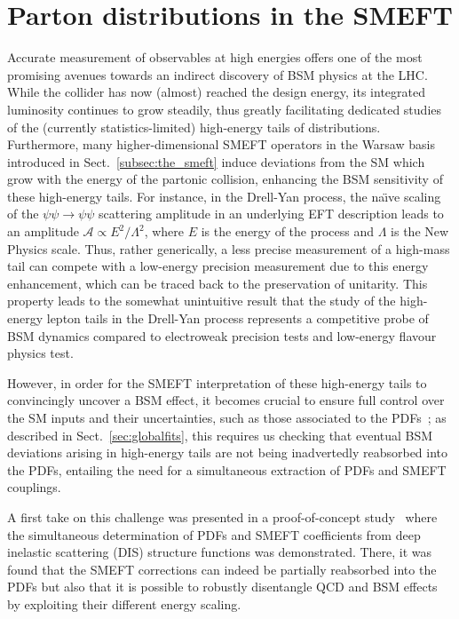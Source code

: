 \documentclass[withindex,glossary]{cam-thesis}
\begin{document}
\section{Parton distributions in the SMEFT}
\label{sec:introduction}
Accurate measurement of observables at high energies offers one of the most promising avenues towards an indirect discovery of BSM physics at the LHC. While the collider has now (almost) reached the design energy, its integrated luminosity continues to grow
steadily, thus greatly facilitating dedicated studies of the
(currently statistics-limited) high-energy tails of distributions. Furthermore, many higher-dimensional SMEFT operators in the Warsaw basis introduced in Sect.~\ref{subsec:the_smeft} induce deviations from the SM which grow
with the energy of the partonic collision, enhancing the BSM sensitivity
of these high-energy tails.
%
For instance, in the Drell-Yan process,  the na\"{\i}ve  scaling of the $\psi \psi \to \psi \psi$ scattering
amplitude in an underlying EFT description leads to an amplitude
$\mathcal{A} \propto E^2 / \Lambda^2$,  where $E$ is the energy of the process and $\Lambda$ is the New Physics scale.
%
Thus, rather generically, a less precise measurement of a high-mass tail can compete with a low-energy precision measurement due to this energy enhancement, which can be traced back to the preservation of unitarity.
%
This property leads to the somewhat unintuitive result that
the study of the high-energy lepton tails in the Drell-Yan process represents a competitive probe
of BSM dynamics compared to electroweak precision tests and low-energy
flavour physics test.

However, in order for the SMEFT interpretation of these high-energy tails
to convincingly uncover a BSM effect, it becomes crucial to ensure
full control over the SM inputs and their
uncertainties, such as those associated to the PDFs~\cite{Gao:2017yyd};
as described in Sect.~\ref{sec:globalfits}, this requires us checking that
eventual BSM deviations arising in high-energy tails are not being
inadvertedly reabsorbed into the PDFs, entailing the need for a simultaneous
extraction of PDFs and SMEFT couplings.

A first take on this challenge was presented in a proof-of-concept study~\cite{Carrazza:2019sec} where
the simultaneous determination of PDFs and SMEFT coefficients from deep inelastic scattering (DIS)
structure functions was demonstrated.
%
There, it was found that the SMEFT corrections can indeed be partially reabsorbed into the PDFs
but also that it is possible to robustly disentangle
QCD and BSM effects by exploiting their different energy scaling.
\end{document}
